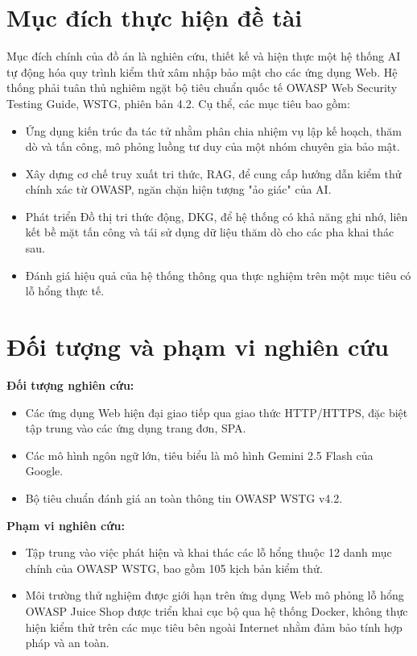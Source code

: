 \section*{Mục đích thực hiện đề tài}
Mục đích chính của đồ án là nghiên cứu, thiết kế và hiện thực một hệ thống AI tự động hóa quy trình kiểm thử xâm nhập bảo mật cho các ứng dụng Web. Hệ thống phải tuân thủ nghiêm ngặt bộ tiêu chuẩn quốc tế OWASP Web Security Testing Guide, WSTG, phiên bản 4.2. Cụ thể, các mục tiêu bao gồm:
\begin{itemize}
    \item Ứng dụng kiến trúc đa tác tử nhằm phân chia nhiệm vụ lập kế hoạch, thăm dò và tấn công, mô phỏng luồng tư duy của một nhóm chuyên gia bảo mật.
    \item Xây dựng cơ chế truy xuất tri thức, RAG, để cung cấp hướng dẫn kiểm thử chính xác từ OWASP, ngăn chặn hiện tượng "ảo giác" của AI.
    \item Phát triển Đồ thị tri thức động, DKG, để hệ thống có khả năng ghi nhớ, liên kết bề mặt tấn công và tái sử dụng dữ liệu thăm dò cho các pha khai thác sau.
    \item Đánh giá hiệu quả của hệ thống thông qua thực nghiệm trên một mục tiêu có lỗ hổng thực tế.
\end{itemize}

\section*{Đối tượng và phạm vi nghiên cứu}
\textbf{Đối tượng nghiên cứu:}
\begin{itemize}
    \item Các ứng dụng Web hiện đại giao tiếp qua giao thức HTTP/HTTPS, đặc biệt tập trung vào các ứng dụng trang đơn, SPA.
    \item Các mô hình ngôn ngữ lớn, tiêu biểu là mô hình Gemini 2.5 Flash của Google.
    \item Bộ tiêu chuẩn đánh giá an toàn thông tin OWASP WSTG v4.2.
\end{itemize}

\textbf{Phạm vi nghiên cứu:}
\begin{itemize}
    \item Tập trung vào việc phát hiện và khai thác các lỗ hổng thuộc 12 danh mục chính của OWASP WSTG, bao gồm 105 kịch bản kiểm thử.
    \item Môi trường thử nghiệm được giới hạn trên ứng dụng Web mô phỏng lỗ hổng OWASP Juice Shop được triển khai cục bộ qua hệ thống Docker, không thực hiện kiểm thử trên các mục tiêu bên ngoài Internet nhằm đảm bảo tính hợp pháp và an toàn.
\end{itemize}

